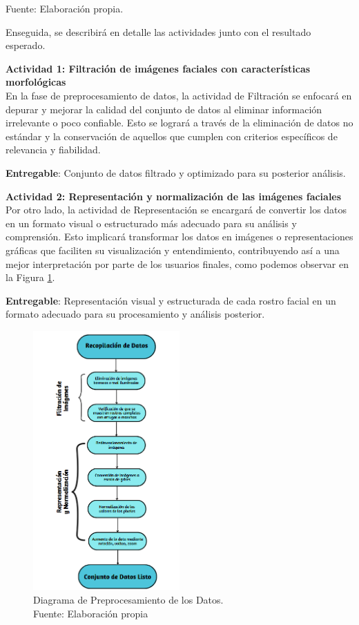\begin{flushleft}
	\small Fuente: Elaboración propia.
\end{flushleft}

Enseguida, se describirá en detalle las actividades junto con el resultado esperado.

\textbf{Actividad 1: Filtración de imágenes faciales con características morfológicas}
\\
En la fase de preprocesamiento de datos, la actividad de Filtración se enfocará en depurar y mejorar la calidad del conjunto de datos al eliminar información irrelevante o poco confiable. Esto se logrará a través de la eliminación de datos no estándar y la conservación de aquellos que cumplen con criterios específicos de relevancia y fiabilidad. 

\textbf{Entregable}: Conjunto de datos filtrado y optimizado para su posterior análisis.

\textbf{Actividad 2: Representación y normalización de las imágenes faciales}
\\
Por otro lado, la actividad de Representación se encargará de convertir los datos en un formato visual o estructurado más adecuado para su análisis y comprensión. Esto implicará transformar los datos en imágenes o representaciones gráficas que faciliten su visualización y entendimiento, contribuyendo así a una mejor interpretación por parte de los usuarios finales, como podemos observar en la Figura \ref{3:fig4}.

\textbf{Entregable}: Representación visual y estructurada de cada rostro facial en un formato adecuado para su procesamiento y análisis posterior.

\begin{figure}[H]
     \begin{center}
         \includegraphics[width=0.5\textwidth]{3/figures/Diagrama de preprocesamiento.png}
         \caption[Diagrama de Preprocesamiento de los Datos]{Diagrama de Preprocesamiento de los Datos.\\
         Fuente: Elaboración propia}
         \label{3:fig4}
     \end{center}
 \end{figure}


